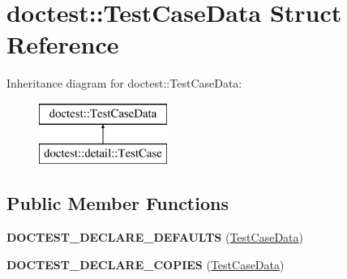 \hypertarget{structdoctest_1_1_test_case_data}{}\section{doctest\+::Test\+Case\+Data Struct Reference}
\label{structdoctest_1_1_test_case_data}
Inheritance diagram for doctest\+::Test\+Case\+Data\+:\begin{figure}[H]
\begin{center}
\leavevmode
\includegraphics[height=2.000000cm]{structdoctest_1_1_test_case_data}
\end{center}
\end{figure}
\subsection*{Public Member Functions}
\begin{DoxyCompactItemize}
\item 
\mbox{\label{structdoctest_1_1_test_case_data_a22cc23a28a474a49b40267fb0e11bc2f}} 
{\bfseries D\+O\+C\+T\+E\+S\+T\+\_\+\+D\+E\+C\+L\+A\+R\+E\+\_\+\+D\+E\+F\+A\+U\+L\+TS} (\mbox{\hyperlink{structdoctest_1_1_test_case_data}{Test\+Case\+Data}})
\item 
\mbox{\label{structdoctest_1_1_test_case_data_a29c10c4961ff7d5f7fa0383f55a3f2b4}} 
{\bfseries D\+O\+C\+T\+E\+S\+T\+\_\+\+D\+E\+C\+L\+A\+R\+E\+\_\+\+C\+O\+P\+I\+ES} (\mbox{\hyperlink{structdoctest_1_1_test_case_data}{Test\+Case\+Data}})
\end{DoxyCompactItemize}
